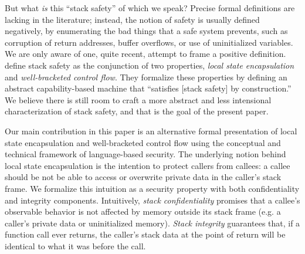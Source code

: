 \documentclass[acmsmall,review,anonymous]{acmart}\settopmatter{printfolios=true,printccs=false,printacmref=false}
\begin{document}
But what {\em is} this ``stack safety'' of which we speak? Precise formal
definitions are lacking in the literature; instead, the notion of safety
is usually defined negatively, by enumerating the bad things that a safe system
prevents, such as corruption of return addresses, buffer overflows, or
use of uninitialized variables.
We are only aware of one, quite recent, attempt to frame a positive definition.
\citet{Skorstengaard+19} define stack safety as
the conjunction of two properties, {\em local state encapsulation} and {\em
  well-bracketed control flow}.
They formalize these properties by defining an abstract capability-based machine
that ``satisfies [stack safety] by construction.'' We believe there is still room
to craft a more abstract and less intensional characterization of
stack safety, and that is the goal of the present paper. 

Our main contribution in this paper is an alternative formal presentation of
local state encapsulation and well-bracketed control flow using the
conceptual and technical framework of language-based security.
%
The underlying notion behind local state encapsulation is the intention to
protect callers from callees: a callee should be not be able to access or
overwrite private data in the caller's stack frame. We formalize this
intuition as a security property with both confidentiality and integrity
components.
%
Intuitively, {\em stack confidentiality} promises that a callee's
observable behavior is not affected by memory outside its stack frame
(e.g. a caller's private data or uninitialized memory).  {\em Stack
  integrity} guarantees that, if a function call ever returns, the caller's
stack data at the point of return will be identical to what it was before
the call.  
\end{document}

